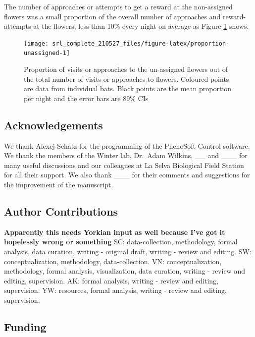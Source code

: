\documentclass[
]{article}
\begin{document}
The number of approaches or attempts to get a reward at the non-assigned flowers was a small proportion of the overall number of approaches and reward-attempts at the flowers, less than 10\% every night on average as Figure \ref{fig:proportion-unassigned} shows.



\begin{figure}[H]

{\centering \texttt{[image: srl\_complete\_210527\_files/figure-latex/proportion-unassigned-1]} 

}

\caption{Proportion of visits or approaches to the un-assigned flowers out of the total number of visits or approaches to flowers. Coloured points are data from individual bats. Black points are the mean proportion per night and the error bars are 89\% CIs}\label{fig:proportion-unassigned}
\end{figure}

\hypertarget{acknowledgements}{%
\subsection{Acknowledgements}\label{acknowledgements}}

We thank Alexej Schatz for the programming of the PhenoSoft Control software. We thank the members of the Winter lab, Dr.~Adam Wilkins, \_\_ and \_\_\_ for many useful discussions and our colleagues at La Selva Biological Field Station for all their support. We also thank \_\_\_ for their comments and suggestions for the improvement of the manuscript.

\hypertarget{author-contributions}{%
\subsection{Author Contributions}\label{author-contributions}}

\textbf{Apparently this needs Yorkian input as well because I've got it hopelessly wrong or something}
SC: data-collection, methodology, formal analysis, data curation, writing - original draft, writing - review and editing. SW: conceptualization, methodology, data-collection. VN: conceptualization, methodology, formal analysis, visualization, data curation, writing - review and editing, supervision. AK: formal analysis, writing - review and editing, supervision. YW: resources, formal analysis, writing - review and editing, supervision.

\hypertarget{funding}{%
\subsection{Funding}\label{funding}}
\end{document}
